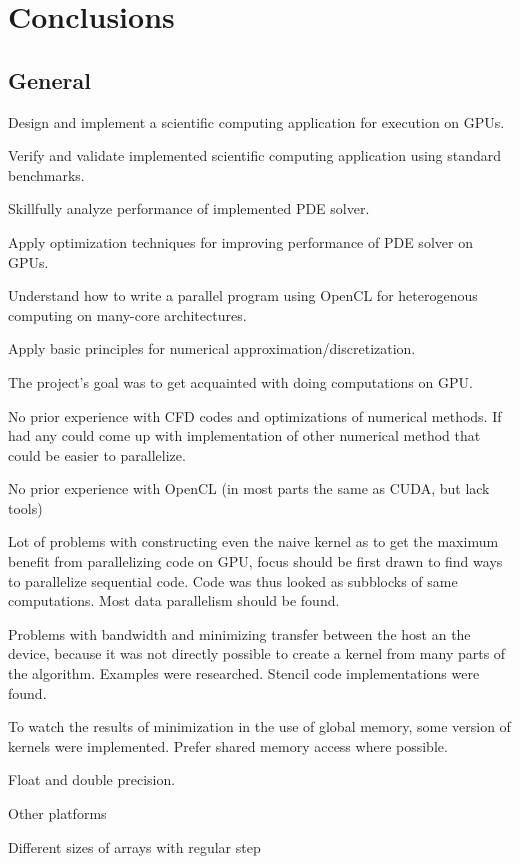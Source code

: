 \chapter{Conclusions}
\section{General}
Design and implement a scientific computing application for execution on GPUs.

Verify and validate implemented scientific computing application using standard benchmarks.

Skillfully analyze performance of implemented PDE solver.

Apply optimization techniques for improving performance of PDE solver on GPUs.

Understand how to write a parallel program using OpenCL for heterogenous computing on many-core architectures.

Apply basic principles for numerical approximation/discretization.



The project's goal was to get acquainted with doing computations on GPU.

No prior experience with CFD codes and optimizations of numerical methods. If had any could come up with implementation of other numerical method that could be easier to parallelize. 

No prior experience with OpenCL (in most parts the same as CUDA, but lack tools)

Lot of problems with constructing even the naive kernel as to get the maximum benefit from parallelizing code on GPU, focus should be first drawn to find ways to parallelize sequential code. Code was thus looked as subblocks of same computations. Most data parallelism should be found.

Problems with bandwidth and minimizing transfer between the host an the device, because it was not directly possible to create a kernel from many parts of the algorithm. Examples were researched. Stencil code implementations were found.

To watch the results of minimization in the use of global memory, some version of kernels were implemented. Prefer shared memory access where possible. 


Float and double precision.

Other platforms

Different sizes of arrays with regular step

